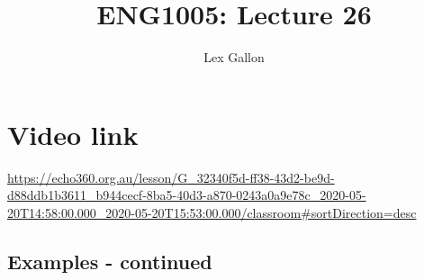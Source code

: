 \documentclass[11pt]{article}
\begin{document}
\title{ENG1005: Lecture 26}
\author{Lex Gallon}
\maketitle

\tableofcontents

\section*{Video link}
\url{https://echo360.org.au/lesson/G_32340f5d-ff38-43d2-be9d-d88ddb1b3611_b944cecf-8ba5-40d3-a870-0243a0a9e78c_2020-05-20T14:58:00.000_2020-05-20T15:53:00.000/classroom#sortDirection=desc}

\subsection{Examples - continued}
\end{document}
